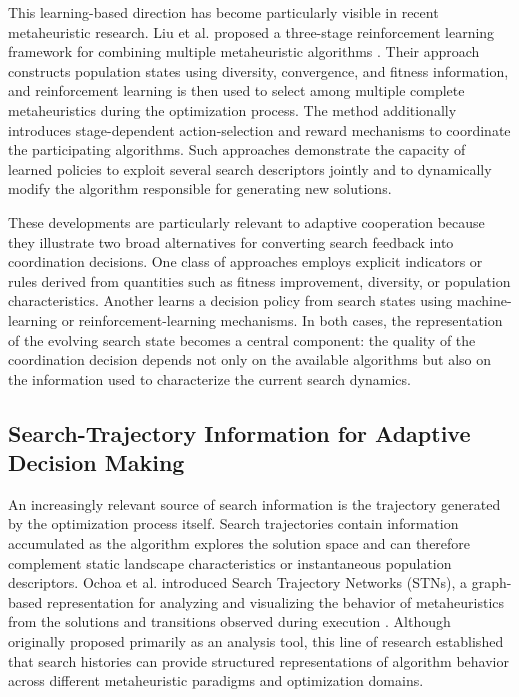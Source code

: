 \documentclass[review]{elsarticle}
\begin{document}
This learning-based direction has become particularly visible in recent
metaheuristic research. Liu et al. proposed a three-stage reinforcement
learning framework for combining multiple metaheuristic algorithms
\cite{liu2025three}. Their approach constructs population states using
diversity, convergence, and fitness information, and reinforcement learning
is then used to select among multiple complete metaheuristics during the
optimization process. The method additionally introduces stage-dependent
action-selection and reward mechanisms to coordinate the participating
algorithms. Such approaches demonstrate the capacity of learned policies to
exploit several search descriptors jointly and to dynamically modify the
algorithm responsible for generating new solutions.

These developments are particularly relevant to adaptive cooperation because
they illustrate two broad alternatives for converting search feedback into
coordination decisions. One class of approaches employs explicit indicators
or rules derived from quantities such as fitness improvement, diversity, or
population characteristics. Another learns a decision policy from search
states using machine-learning or reinforcement-learning mechanisms. In both
cases, the representation of the evolving search state becomes a central
component: the quality of the coordination decision depends not only on the
available algorithms but also on the information used to characterize the
current search dynamics.


\subsection{Search-Trajectory Information for Adaptive Decision Making}
\label{subsec:trajectory_related}

An increasingly relevant source of search information is the trajectory
generated by the optimization process itself. Search trajectories contain
information accumulated as the algorithm explores the solution space and
can therefore complement static landscape characteristics or instantaneous
population descriptors. Ochoa et al. introduced Search Trajectory Networks
(STNs), a graph-based representation for analyzing and visualizing the
behavior of metaheuristics from the solutions and transitions observed
during execution \cite{ochoa2021search}. Although originally proposed primarily
as an analysis tool, this line of research established that search histories
can provide structured representations of algorithm behavior across
different metaheuristic paradigms and optimization domains.
\end{document}
